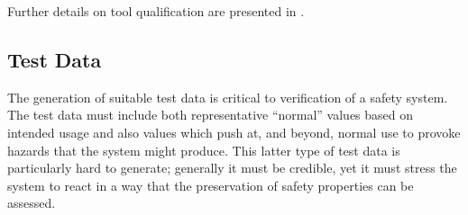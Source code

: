 

Further details on tool qualification are presented in .

\subsection{Test Data}
The generation of suitable test data is critical to verification of a safety system. The test data must include both representative ``normal'' values based on intended usage and also values which push at, and beyond, normal use to provoke \glspl{hazard} that the system might produce. This latter type of test data is particularly hard to generate; generally it must be credible, yet it must stress the system to react in a way that the preservation of safety properties can be assessed. 

